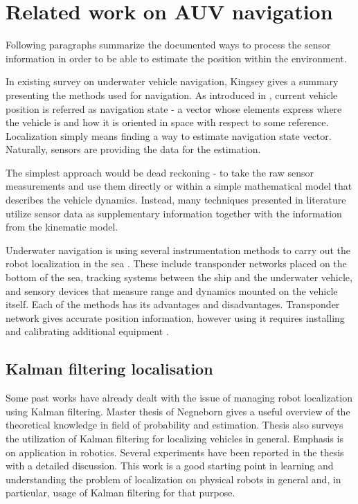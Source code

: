 \section{Related work on AUV navigation}\label{sec:lit-review}
Following paragraphs summarize the documented ways to process the sensor information in order to be able to estimate the position within the environment. 

In existing survey on underwater vehicle navigation, Kingsey \cite{kinsey06} gives a summary presenting the methods used for navigation. As introduced in \cite{kinsey06}, current vehicle position is referred as navigation state - a vector whose elements express where the vehicle is and how it is oriented in space with respect to some reference. Localization simply means finding a way to estimate navigation state vector. Naturally, sensors are providing the data for the estimation.

The simplest approach would be dead reckoning - to take the raw sensor measurements and use them directly or within a simple mathematical model that describes the vehicle dynamics. Instead, many techniques presented in literature utilize sensor data as supplementary information together with the information from the kinematic model.

Underwater navigation is using several instrumentation methods to carry out the robot localization in the sea \cite{whitcomb99}. These include transponder networks placed on the bottom of the sea, tracking systems between the ship and the underwater vehicle, and sensory devices that measure range and dynamics mounted on the vehicle itself. Each of the methods has its advantages and disadvantages. Transponder network gives accurate position information, however using it requires installing and calibrating additional equipment \cite{eustice05}.

\subsection{Kalman filtering localisation}
Some past works have already dealt with the issue of managing robot localization using Kalman filtering. Master thesis of Negneborn \cite{negenborn03} gives a useful overview of the theoretical knowledge in field of probability and estimation. Thesis also surveys the utilization of Kalman filtering for localizing vehicles in general. Emphasis is on application in robotics. Several experiments have been reported in the thesis with a detailed discussion. This work is a good starting point in learning and understanding the problem of localization on physical robots in general and, in particular, usage of Kalman filtering for that purpose.

